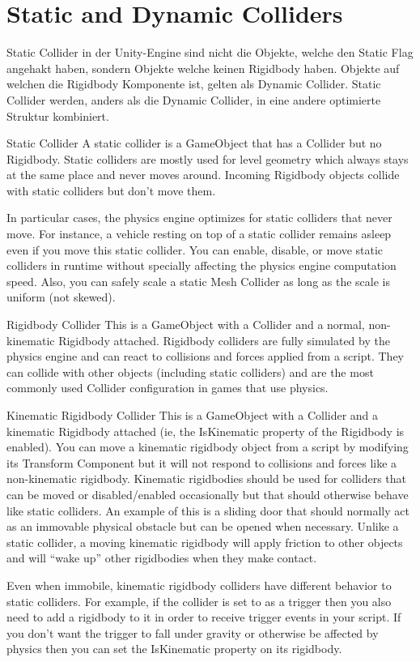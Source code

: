 \section{Static and Dynamic Colliders}
Static Collider in der Unity-Engine sind nicht die Objekte, welche den Static Flag angehakt haben, sondern Objekte welche keinen Rigidbody haben. Objekte auf welchen die Rigidbody Komponente ist, gelten als Dynamic Collider. Static Collider werden, anders als die Dynamic Collider, in eine andere optimierte Struktur kombiniert.

Static Collider
A static collider is a GameObject that has a Collider but no Rigidbody. Static colliders are mostly used for level geometry which always stays at the same place and never moves around. Incoming Rigidbody objects collide with static colliders but don’t move them.

In particular cases, the physics engine optimizes for static colliders that never move. For instance, a vehicle resting on top of a static collider remains asleep even if you move this static collider. You can enable, disable, or move static colliders in runtime without specially affecting the physics engine computation speed. Also, you can safely scale a static Mesh Collider as long as the scale is uniform (not skewed).

Rigidbody Collider
This is a GameObject with a Collider and a normal, non-kinematic Rigidbody attached. Rigidbody colliders are fully simulated by the physics engine and can react to collisions and forces applied from a script. They can collide with other objects (including static colliders) and are the most commonly used Collider configuration in games that use physics.

Kinematic Rigidbody Collider
This is a GameObject with a Collider and a kinematic Rigidbody attached (ie, the IsKinematic property of the Rigidbody is enabled). You can move a kinematic rigidbody object from a script by modifying its Transform Component
but it will not respond to collisions and forces like a non-kinematic rigidbody. Kinematic rigidbodies should be used for colliders that can be moved or disabled/enabled occasionally but that should otherwise behave like static colliders. An example of this is a sliding door that should normally act as an immovable physical obstacle but can be opened when necessary. Unlike a static collider, a moving kinematic rigidbody will apply friction to other objects and will “wake up” other rigidbodies when they make contact.

Even when immobile, kinematic rigidbody colliders have different behavior to static colliders. For example, if the collider is set to as a trigger then you also need to add a rigidbody to it in order to receive trigger events in your script. If you don’t want the trigger to fall under gravity or otherwise be affected by physics then you can set the IsKinematic property on its rigidbody.

